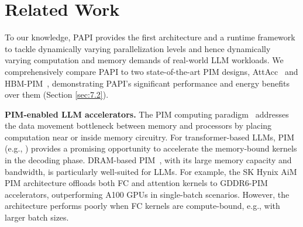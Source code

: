 \section{Related Work}


To our knowledge, PAPI provides the first architecture and a runtime framework to tackle dynamically varying parallelization levels and hence dynamically varying computation and memory demands of real-world LLM workloads. We comprehensively compare PAPI to two state-of-the-art PIM designs, AttAcc~\cite{park2024attacc} and HBM-PIM~\cite{lee2021hardware}, demonstrating PAPI's significant performance and energy benefits over them (Section \ref{sec:7.2}).




\noindent\textbf{PIM-enabled LLM accelerators.}
The PIM computing paradigm~\cite{mutlu2022modern} addresses the data movement bottleneck between memory and processors by placing computation near or inside memory circuitry.
For transformer-based LLMs, PIM (e.g., \cite{he2020newton, kwon202125, skhynixpim, kwon2022system, park2024lpddr, kal2023aespa, lee2021hardware,jang2024smart, yazdanbakhsh2022sparse, li2024asadi, zhou2022transpim}) provides a promising opportunity to accelerate the memory-bound kernels in the decoding phase.
DRAM-based PIM~\cite{he2020newton, mutlu2024memory}, with its large memory capacity and bandwidth, is particularly well-suited for LLMs. For example, the SK Hynix AiM PIM architecture \cite{kwon2022system} offloads both FC and attention kernels to GDDR6-PIM accelerators, outperforming A100 GPUs in single-batch scenarios. However, the architecture performs poorly when FC kernels are compute-bound, e.g., with larger batch sizes.


